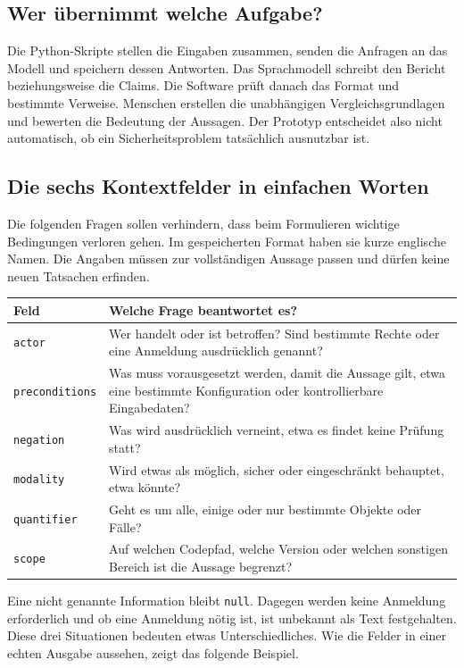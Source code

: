 \documentclass[10pt,a4paper]{article}
\begin{document}
\subsection{Wer übernimmt welche Aufgabe?}
Die Python-Skripte stellen die Eingaben zusammen, senden die Anfragen an das Modell und speichern dessen Antworten. Das Sprachmodell schreibt den Bericht beziehungsweise die Claims. Die Software prüft danach das Format und bestimmte Verweise. Menschen erstellen die unabhängigen Vergleichsgrundlagen und bewerten die Bedeutung der Aussagen. Der Prototyp entscheidet also nicht automatisch, ob ein Sicherheitsproblem tatsächlich ausnutzbar ist.

\subsection{Die sechs Kontextfelder in einfachen Worten}
Die folgenden Fragen sollen verhindern, dass beim Formulieren wichtige Bedingungen verloren gehen. Im gespeicherten Format haben sie kurze englische Namen. Die Angaben müssen zur vollständigen Aussage passen und dürfen keine neuen Tatsachen erfinden.

\begin{tabularx}{\linewidth}{@{}p{33mm}Y@{}}
\toprule
\textbf{Feld} & \textbf{Welche Frage beantwortet es?} \\ \midrule
\texttt{actor} & Wer handelt oder ist betroffen? Sind bestimmte Rechte oder eine Anmeldung ausdrücklich genannt? \\
\texttt{preconditions} & Was muss vorausgesetzt werden, damit die Aussage gilt, etwa eine bestimmte Konfiguration oder kontrollierbare Eingabedaten? \\
\texttt{negation} & Was wird ausdrücklich verneint, etwa \glqq{}es findet keine Prüfung statt\grqq{}? \\
\texttt{modality} & Wird etwas als möglich, sicher oder eingeschränkt behauptet, etwa \glqq{}könnte\grqq{}? \\
\texttt{quantifier} & Geht es um alle, einige oder nur bestimmte Objekte oder Fälle? \\
\texttt{scope} & Auf welchen Codepfad, welche Version oder welchen sonstigen Bereich ist die Aussage begrenzt? \\
\bottomrule
\end{tabularx}

Eine nicht genannte Information bleibt \texttt{null}. Dagegen werden \glqq{}keine Anmeldung erforderlich\grqq{} und \glqq{}ob eine Anmeldung nötig ist, ist unbekannt\grqq{} als Text festgehalten. Diese drei Situationen bedeuten etwas Unterschiedliches. Wie die Felder in einer echten Ausgabe aussehen, zeigt das folgende Beispiel.
\end{document}
